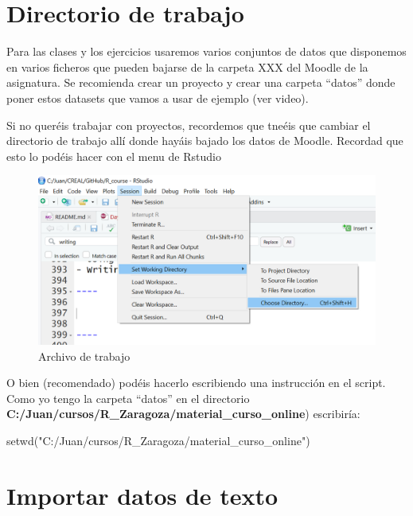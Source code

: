 \documentclass[
]{book}
\newenvironment{Shaded}{\begin{snugshade}}{\end{snugshade}}
\newcommand{\FunctionTok}[1]{\textcolor[rgb]{0.00,0.00,0.00}{#1}}
\newcommand{\NormalTok}[1]{#1}
\newcommand{\StringTok}[1]{\textcolor[rgb]{0.31,0.60,0.02}{#1}}
\begin{document}
\hypertarget{directorio-de-trabajo}{%
\section{Directorio de trabajo}\label{directorio-de-trabajo}}

Para las clases y los ejercicios usaremos varios conjuntos de datos que disponemos en varios ficheros que pueden bajarse de la carpeta XXX del Moodle de la asignatura. Se recomienda crear un proyecto y crear una carpeta ``datos'' donde poner estos datasets que vamos a usar de ejemplo (ver video).

Si no queréis trabajar con proyectos, recordemos que tneéis que cambiar el directorio de trabajo allí donde hayáis bajado los datos de Moodle. Recordad que esto lo podéis hacer con el menu de Rstudio

\begin{figure}
\centering
\includegraphics{figures/setwd.png}
\caption{Archivo de trabajo}
\end{figure}

O bien (recomendado) podéis hacerlo escribiendo una instrucción en el script. Como yo tengo la carpeta ``datos'' en el directorio \textbf{C:/Juan/cursos/R\_Zaragoza/material\_curso\_online}) escribiría:

\begin{Shaded}
\begin{Highlighting}[]
\FunctionTok{setwd}\NormalTok{(}\StringTok{"C:/Juan/cursos/R\_Zaragoza/material\_curso\_online"}\NormalTok{)}
\end{Highlighting}
\end{Shaded}

\hypertarget{importar-datos-de-texto}{%
\section{Importar datos de texto}\label{importar-datos-de-texto}}
\end{document}
